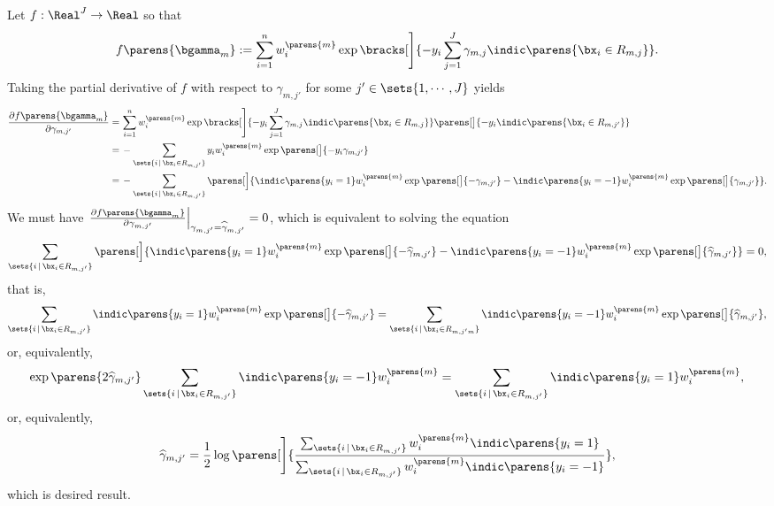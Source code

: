 \documentclass[12pt]{article}
\begin{document}
\begin{enumerate}[label=\textbf{\arabic*.}]
	Let $f: \Real^J \to \Real$ so that 
	\begin{align*}
		f \parens{\bgamma_m} := \sum_{i=1}^n w_i^{\parens{m}} \exp \bracks[\Bigg]{-y_i \sum_{j=1}^J \gamma_{m,j} \indic \parens{\bx_i \in R_{m,j}}}. 
	\end{align*}
	Taking the partial derivative of $f$ with respect to $\gamma_{m, j'}$ for some $j' \in \sets{1, \cdots, J}$ yields 
	\begin{align*}
		\frac{\partial f \parens{\bgamma_m}}{\partial \gamma_{m,j'}} = & \, \sum_{i=1}^n w_i^{\parens{m}} \exp \bracks[\Bigg]{-y_i \sum_{j=1}^J \gamma_{m,j} \indic \parens{\bx_i \in R_{m,j}}} \parens[\big]{-y_i \indic \parens{\bx_i \in R_{m, j'}}} \\ 
		= & \, - \sum_{\sets{i \,\vert\, \bx_i \in R_{m,j'}}} y_i w_i^{\parens{m}} \exp \parens[\big]{-y_i \gamma_{m,j'}} \\ 
		= & \, - \sum_{\sets{i \,\vert\, \bx_i \in R_{m,j'}}} \parens[\Big]{\indic \parens{y_i = 1} w_i^{\parens{m}} \exp \parens[\big]{- \gamma_{m,j'}} - \indic \parens{y_i = -1} w_i^{\parens{m}} \exp \parens[\big]{\gamma_{m,j'}}}. 
	\end{align*}
	We must have $\left.\frac{\partial f\parens{\bgamma_m}}{\partial \gamma_{m,j'}}\right\vert_{\gamma_{m,j'} = \widehat{\gamma}_{m,j'}} = 0$, which is equivalent to solving the equation 
	\begin{align*}
		\sum_{\sets{i \,\vert\, \bx_i \in R_{m,j'}}} \parens[\Big]{\indic \parens{y_i = 1} w_i^{\parens{m}} \exp \parens[\big]{- \widehat{\gamma}_{m,j'}} - \indic \parens{y_i = -1} w_i^{\parens{m}} \exp \parens[\big]{\widehat{\gamma}_{m,j'}}} = 0, 
	\end{align*}
	that is, 
	\begin{align*}
		\sum_{\sets{i \,\vert\, \bx_i \in R_{m,j'}}} \indic \parens{y_i = 1} w_i^{\parens{m}} \exp \parens[\big]{- \widehat{\gamma}_{m,j'}} = \sum_{\sets{i \,\vert\, \bx_i \in R_{m,j'm}}} \indic \parens{y_i = -1} w_i^{\parens{m}} \exp \parens[\big]{\widehat{\gamma}_{m,j'}}, 
	\end{align*}
	or, equivalently, 
	\begin{align*}
		\exp \parens{2 \widehat{\gamma}_{m,j'}} \sum_{\sets{i \,\vert\, \bx_i \in R_{m,j'}}} \indic \parens{y_i = -1} w_i^{\parens{m}} = \sum_{\sets{i \,\vert\, \bx_i \in R_{m,j'}}} \indic \parens{y_i = 1} w_i^{\parens{m}}, 
	\end{align*}
	or, equivalently, 
	\begin{align*}
		\widehat{\gamma}_{m, j'} = \frac{1}{2} \log \parens[\Bigg]{ \frac{\sum_{\sets{i \,\vert\, \bx_i \in R_{m,j'}}} w_i^{\parens{m}} \indic \parens{y_i = 1}}{\sum_{\sets{ i \,\vert\, \bx_i \in R_{m,j'}}} w_i^{\parens{m}} \indic \parens{y_i = -1}}}, 
	\end{align*}
	which is desired result. 

\end{enumerate}
\end{document}
